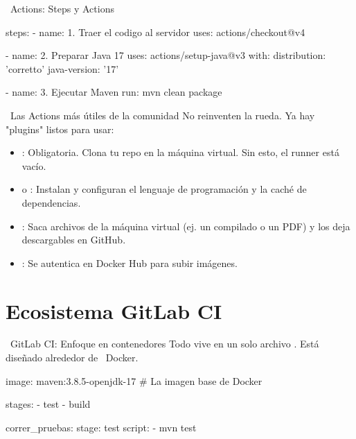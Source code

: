 \documentclass[aspectratio=169]{beamer}
\begin{document}
\begin{frame}[fragile]{\faGithub\ Actions: Steps y Actions}
    \begin{codebox}
\begin{yamlcode}
    steps:
      - name: 1. Traer el codigo al servidor
        uses: actions/checkout@v4
    
      - name: 2. Preparar Java 17
        uses: actions/setup-java@v3
        with:
          distribution: 'corretto'
          java-version: '17'

      - name: 3. Ejecutar Maven
        run: mvn clean package
\end{yamlcode}
\end{codebox}
\end{frame}

\begin{frame}{\faGithub\ Las Actions más útiles de la comunidad}
    No reinventen la rueda. Ya hay "plugins" listos para usar:
    
    \vspace{0.3cm}
    \begin{itemize}
        \item {}: Obligatoria. Clona tu repo en la máquina virtual. Sin esto, el runner está vacío.
        \item {} o : Instalan y configuran el lenguaje de programación y la caché de dependencias.
        \item {}: Saca archivos de la máquina virtual (ej. un  compilado o un PDF) y los deja descargables en GitHub.
        \item {}: Se autentica en Docker Hub para subir imágenes.
    \end{itemize}
\end{frame}

\section{Ecosistema GitLab CI}

\begin{frame}[fragile]{\faGitlab\ GitLab CI: Enfoque en contenedores}
    Todo vive en un solo archivo . Est\'a dise\~nado alrededor de \faLinux\ Docker.
    
    \begin{codebox}
\begin{yamlcode}
image: maven:3.8.5-openjdk-17 # La imagen base de Docker

stages:
  - test
  - build

correr_pruebas:
  stage: test
  script:
    - mvn test
\end{yamlcode}
    \end{codebox}
\end{frame}
\end{document}
